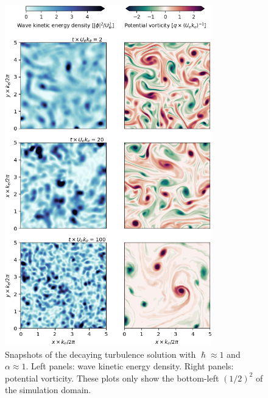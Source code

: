 \documentclass[final]{beamer}
\begin{document}
\begin{frame}[t]
\begin{columns}[t]
\begin{column}{0.55\textwidth}
\begin{columns}
\begin{column}{.475\textwidth}
                        \begin{figure}
                          \includegraphics[width=0.8\textwidth]{figs/snapshots_turbulence.png}
                          \caption{Snapshots of the decaying turbulence solution with $\hslash \approx 1$
                                  and $\alpha \approx 1$. Left panels: wave kinetic energy density.
                                  Right panels: potential vorticity. These plots only show the bottom-left
                                 $(1/2)^2$ of the simulation domain.}
                        \end{figure}


\end{column}
\end{columns}
\end{column}
\end{columns}
\end{frame}
\end{document}
